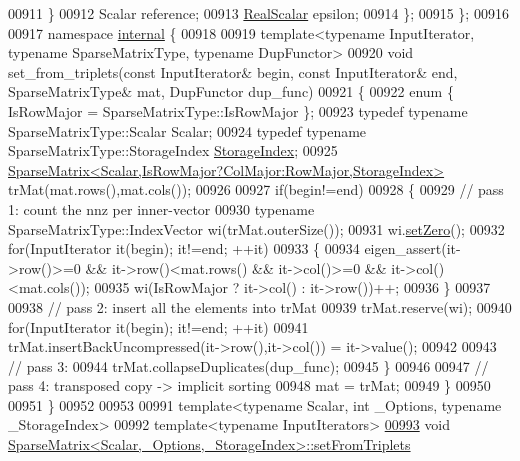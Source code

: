 \begin{DoxyCode}
00911     \}
00912     Scalar reference;
00913     \hyperlink{group___sparse_core___module_aaec8ace6efb785c81d442931c3248d88}{RealScalar} epsilon;
00914   \};
00915 \};
00916 
00917 \textcolor{keyword}{namespace }\hyperlink{namespaceinternal}{internal} \{
00918 
00919 \textcolor{keyword}{template}<\textcolor{keyword}{typename} InputIterator, \textcolor{keyword}{typename} SparseMatrixType, \textcolor{keyword}{typename} DupFunctor>
00920 \textcolor{keywordtype}{void} set\_from\_triplets(\textcolor{keyword}{const} InputIterator& begin, \textcolor{keyword}{const} InputIterator& end, SparseMatrixType& mat, 
      DupFunctor dup\_func)
00921 \{
00922   \textcolor{keyword}{enum} \{ IsRowMajor = SparseMatrixType::IsRowMajor \};
00923   \textcolor{keyword}{typedef} \textcolor{keyword}{typename} SparseMatrixType::Scalar Scalar;
00924   \textcolor{keyword}{typedef} \textcolor{keyword}{typename} SparseMatrixType::StorageIndex \hyperlink{group___sparse_core___module_a0b540ba724726ebe953f8c0df06081ed}{StorageIndex};
00925   \hyperlink{group___sparse_core___module_class_eigen_1_1_sparse_matrix}{SparseMatrix<Scalar,IsRowMajor?ColMajor:RowMajor,StorageIndex>}
       trMat(mat.rows(),mat.cols());
00926 
00927   \textcolor{keywordflow}{if}(begin!=end)
00928   \{
00929     \textcolor{comment}{// pass 1: count the nnz per inner-vector}
00930     \textcolor{keyword}{typename} SparseMatrixType::IndexVector wi(trMat.outerSize());
00931     wi.\hyperlink{group___sparse_core___module_ad3c7416090f913e8685523cb3ab7c2f7}{setZero}();
00932     \textcolor{keywordflow}{for}(InputIterator it(begin); it!=end; ++it)
00933     \{
00934       eigen\_assert(it->row()>=0 && it->row()<mat.rows() && it->col()>=0 && it->col()<mat.cols());
00935       wi(IsRowMajor ? it->col() : it->row())++;
00936     \}
00937 
00938     \textcolor{comment}{// pass 2: insert all the elements into trMat}
00939     trMat.reserve(wi);
00940     \textcolor{keywordflow}{for}(InputIterator it(begin); it!=end; ++it)
00941       trMat.insertBackUncompressed(it->row(),it->col()) = it->value();
00942 
00943     \textcolor{comment}{// pass 3:}
00944     trMat.collapseDuplicates(dup\_func);
00945   \}
00946 
00947   \textcolor{comment}{// pass 4: transposed copy -> implicit sorting}
00948   mat = trMat;
00949 \}
00950 
00951 \}
00952 
00953 
00991 \textcolor{keyword}{template}<\textcolor{keyword}{typename} Scalar, \textcolor{keywordtype}{int} \_Options, \textcolor{keyword}{typename} \_StorageIndex>
00992 \textcolor{keyword}{template}<\textcolor{keyword}{typename} InputIterators>
\hyperlink{group___sparse_core___module_acc35051d698e3973f1de5b9b78dbe345}{00993} \textcolor{keywordtype}{void} \hyperlink{group___sparse_core___module_acc35051d698e3973f1de5b9b78dbe345}{SparseMatrix<Scalar,\_Options,\_StorageIndex>::setFromTriplets}

\end{DoxyCode}
